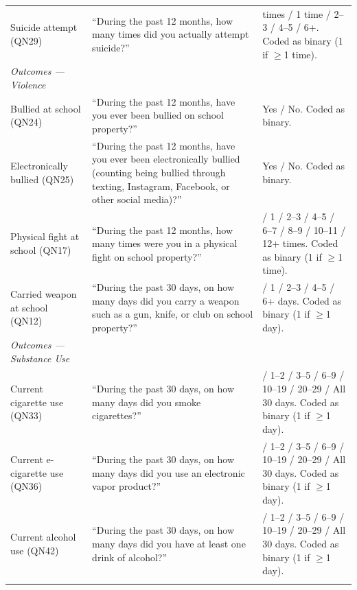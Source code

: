 \documentclass[12pt]{article}
\begin{document}
\begin{landscape}
\begin{longtable}{>{\raggedright\arraybackslash}p{2.2in} >{\raggedright\arraybackslash}p{4.0in} >{\raggedright\arraybackslash}p{2.8in}}
Suicide attempt (QN29) &
``During the past 12 months, how many times did you actually attempt suicide?'' &
0 times / 1 time / 2--3 / 4--5 / 6+.
Coded as binary (1 if $\geq$1 time). \\

\addlinespace[6pt]
\textit{Outcomes --- Violence} \\
\addlinespace[2pt]

Bullied at school (QN24) &
``During the past 12 months, have you ever been bullied on school property?'' &
Yes / No. Coded as binary. \\
\addlinespace[3pt]

Electronically bullied (QN25) &
``During the past 12 months, have you ever been electronically bullied (counting being
bullied through texting, Instagram, Facebook, or other social media)?'' &
Yes / No. Coded as binary. \\
\addlinespace[3pt]

Physical fight at school (QN17) &
``During the past 12 months, how many times were you in a physical fight on school
property?'' &
0 / 1 / 2--3 / 4--5 / 6--7 / 8--9 / 10--11 / 12+ times.
Coded as binary (1 if $\geq$1 time). \\
\addlinespace[3pt]

Carried weapon at school (QN12) &
``During the past 30 days, on how many days did you carry a weapon such as a gun,
knife, or club on school property?'' &
0 / 1 / 2--3 / 4--5 / 6+ days.
Coded as binary (1 if $\geq$1 day). \\

\addlinespace[6pt]
\textit{Outcomes --- Substance Use} \\
\addlinespace[2pt]

Current cigarette use (QN33) &
``During the past 30 days, on how many days did you smoke cigarettes?'' &
0 / 1--2 / 3--5 / 6--9 / 10--19 / 20--29 / All 30 days.
Coded as binary (1 if $\geq$1 day). \\
\addlinespace[3pt]

Current e-cigarette use (QN36) &
``During the past 30 days, on how many days did you use an electronic vapor product?'' &
0 / 1--2 / 3--5 / 6--9 / 10--19 / 20--29 / All 30 days.
Coded as binary (1 if $\geq$1 day). \\
\addlinespace[3pt]

Current alcohol use (QN42) &
``During the past 30 days, on how many days did you have at least one drink of
alcohol?'' &
0 / 1--2 / 3--5 / 6--9 / 10--19 / 20--29 / All 30 days.
Coded as binary (1 if $\geq$1 day). \\
\addlinespace[3pt]


\end{longtable}
\end{landscape}
\end{document}
